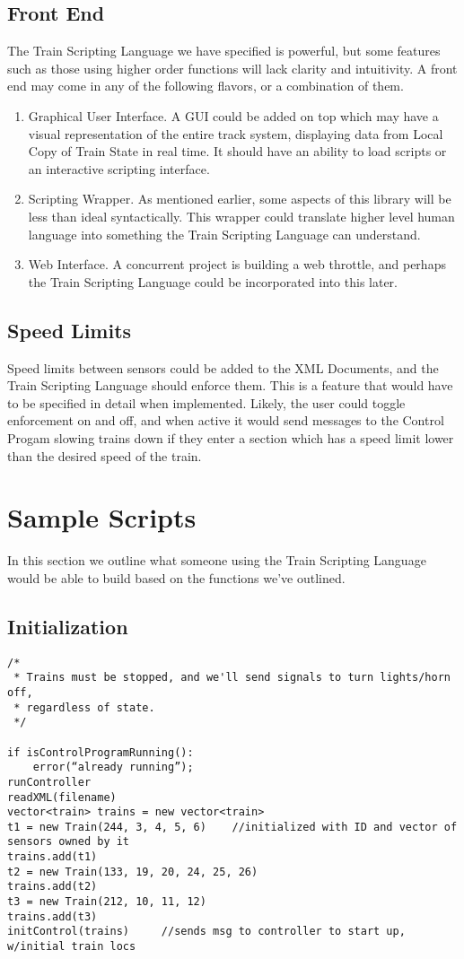 \documentclass[a4paper,11pt,notitlepage]{article}
\def\TSL{Train Scripting Language\xspace}
\def\CS{Control Progam\xspace} \def\LC{Local Copy of Train State\xspace} \def\TN{Track Node\xspace}
\begin{document}
\subsection{Front End}
The \TSL we have specified is powerful, but some features such as those using higher order functions will lack clarity and intuitivity. A front end may come in any of the following flavors, or a combination of them.
\begin{enumerate}
	\item Graphical User Interface. A GUI could be added on top which may have a visual representation of the entire track system, displaying data from \LC in real time. It should have an ability to load scripts or an interactive scripting interface.
	\item Scripting Wrapper. As mentioned earlier, some aspects of this library will be less than ideal syntactically. This wrapper could translate higher level human language into something the \TSL can understand.
	\item Web Interface. A concurrent project is building a web throttle, and perhaps the \TSL could be incorporated into this later.
\end{enumerate}
\subsection{Speed Limits}
Speed limits between sensors could be added to the XML Documents, and the \TSL should enforce them. This is a feature that would have to be specified in detail when implemented. Likely, the user could toggle enforcement on and off, and when active it would send messages to the \CS slowing trains down if they enter a section which has a speed limit lower than the desired speed of the train.

\newpage
\section{Sample Scripts}
In this section we outline what someone using the \TSL would be able to build based on the functions we've outlined.

\subsection{Initialization}
\begin{verbatim}
/*
 * Trains must be stopped, and we'll send signals to turn lights/horn off,
 * regardless of state.
 */

if isControlProgramRunning():
    error(“already running”);
runController
readXML(filename)
vector<train> trains = new vector<train>
t1 = new Train(244, 3, 4, 5, 6)    //initialized with ID and vector of sensors owned by it
trains.add(t1)
t2 = new Train(133, 19, 20, 24, 25, 26)
trains.add(t2)
t3 = new Train(212, 10, 11, 12)
trains.add(t3)
initControl(trains)     //sends msg to controller to start up, w/initial train locs
\end{verbatim}
\end{document}
